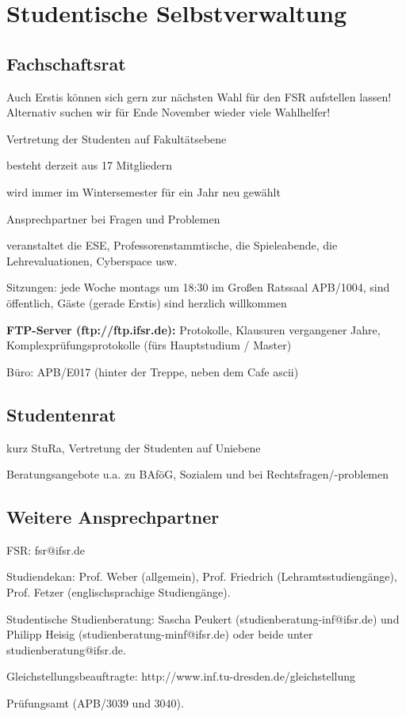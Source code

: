 \documentclass[a4paper,12pt]{report}
\begin{document}
\section{Studentische Selbstverwaltung}

\subsection{Fachschaftsrat}
\begin{itemize*}
	\item Auch Erstis können sich gern zur nächsten Wahl für den FSR aufstellen lassen! Alternativ suchen wir für Ende November wieder viele Wahlhelfer!
	\item Vertretung der Studenten auf Fakultätsebene
	\item besteht derzeit aus 17 Mitgliedern
	\item wird immer im Wintersemester für ein Jahr neu gewählt
	\item Ansprechpartner bei Fragen und Problemen
	\item veranstaltet die ESE, Professorenstammtische, die Spieleabende, die Lehrevaluationen, Cyberspace usw.
	\item Sitzungen: jede Woche montags um 18:30 im Großen Ratssaal APB/1004, sind öffentlich, Gäste (gerade Erstis) sind herzlich willkommen
	\item \textbf{FTP-Server (ftp://ftp.ifsr.de):} Protokolle, Klausuren vergangener Jahre, Komplexprüfungsprotokolle (fürs Hauptstudium / Master)
	\item Büro: APB/E017 (hinter der Treppe, neben dem Cafe ascii)	
\end{itemize*}

\subsection{Studentenrat}
\begin{itemize*}
	\item kurz StuRa, Vertretung der Studenten auf Uniebene
	\item Beratungsangebote u.a. zu BAföG, Sozialem und bei Rechtsfragen/-problemen
\end{itemize*}

\subsection{Weitere Ansprechpartner}
\begin{itemize*}
	\item FSR: fsr@ifsr.de
	\item Studiendekan: Prof. Weber (allgemein), Prof. Friedrich (Lehramtsstudiengänge), Prof. Fetzer (englischsprachige Studiengänge).
	\item Studentische Studienberatung: Sascha Peukert (studienberatung-inf@ifsr.de) und Philipp Heisig (studienberatung-minf@ifsr.de) oder beide unter studienberatung@ifsr.de.
	\item Gleichstellungsbeauftragte: http://www.inf.tu-dresden.de/gleichstellung 
	\item Prüfungsamt (APB/3039 und 3040).
\end{itemize*}
\end{document}
